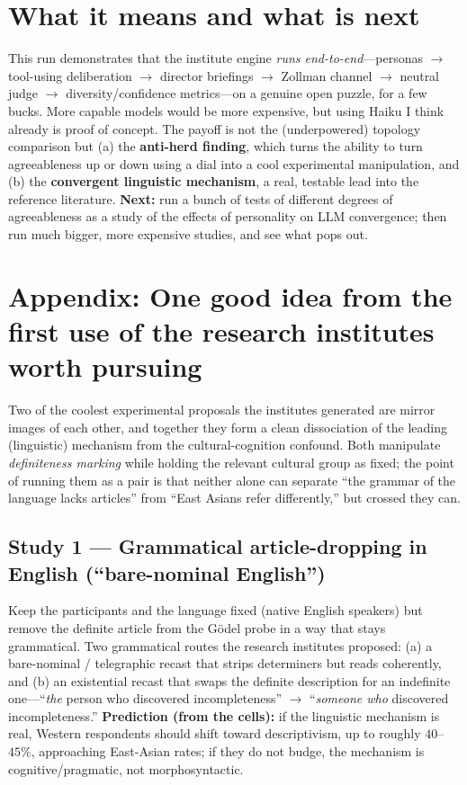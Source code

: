 \documentclass[11pt]{article}
\begin{document}
\section{What it means and what is next}

This run demonstrates that the institute engine \emph{runs end-to-end}---personas $\to$ tool-using deliberation $\to$ director briefings $\to$ Zollman channel $\to$ neutral judge $\to$ diversity/confidence metrics---on a genuine open puzzle, for a few bucks. More capable models would be more expensive, but using Haiku I think already is proof of concept. The payoff is not the (underpowered) topology comparison but (a) the \textbf{anti-herd finding}, which turns the ability to turn agreeableness up or down using a dial into a cool experimental manipulation, and (b) the \textbf{convergent linguistic mechanism}, a real, testable lead into the reference literature. \textbf{Next:} run a bunch of tests of different degrees of agreeableness as a study of the effects of personality on LLM convergence; then run much bigger, more expensive studies, and see what pops out. 

\section*{Appendix: One good idea from the first use of the research institutes worth pursuing}

Two of the coolest experimental proposals the institutes generated are mirror images of each other, and together they form a clean dissociation of the leading (linguistic) mechanism from the cultural-cognition confound. Both manipulate \emph{definiteness marking} while holding the relevant cultural group as fixed; the point of running them as a pair is that neither alone can separate ``the grammar of the language lacks articles'' from ``East Asians refer differently,'' but crossed they can.

\subsection*{Study 1 --- Grammatical article-dropping in English (``bare-nominal English'')}

Keep the participants and the language fixed (native English speakers) but remove the definite article from the G\"odel probe in a way that stays grammatical. Two grammatical routes the research institutes proposed: (a) a bare-nominal / telegraphic recast that strips determiners but reads coherently, and (b) an existential recast that swaps the definite description for an indefinite one---``\emph{the} person who discovered incompleteness'' $\to$ ``\emph{someone who} discovered incompleteness.'' \textbf{Prediction (from the cells):} if the linguistic mechanism is real, Western respondents should shift toward descriptivism, up to roughly $40$--$45\%$, approaching East-Asian rates; if they do not budge, the mechanism is cognitive/pragmatic, not morphosyntactic.
\end{document}
